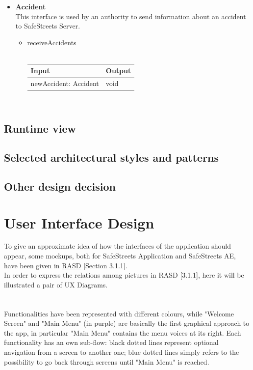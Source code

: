 \documentclass{article}
\begin{document}
\begin{itemize}
			\item \textbf{Accident}\\
				This interface is used by an authority to send information about an accident to SafeStreets Server.
				\begin{itemize}
					\item{receiveAccidents}\\\\
					\begin{tabular}{l | l}
						\textbf{Input} & \textbf{Output}\\
						\hline
						newAccident: Accident & void\\
					\end{tabular}\\
				\end{itemize}
		\end{itemize}
		\subsection{Runtime	view}
		\subsection{Selected architectural styles and patterns}
		\subsection{Other design decision}
	\clearpage	
	\section{User Interface Design}
		To give an approximate idea of how the interfaces of the application should appear, some mockups, both for SafeStreets Application and SafeStreets AE, have been given in \href{run:d:../DeliveryFolder/RASD1.pdf}{RASD} [Section 3.1.1].\\ 
		In order to express the relations among pictures in RASD [3.1.1], here it will be illustrated a pair of UX Diagrams.
		\\\\\\
		Functionalities have been represented with different colours, while "Welcome Screen" and "Main Menu" (in purple) are basically the first graphical approach to the app, in particular "Main Menu" contains the menu voices at its right.
		Each functionality has an own sub-flow: black dotted lines represent optional navigation from a screen to another one; blue dotted lines simply refers to the possibility to go back through screens until "Main Menu" is reached.
		
\end{document}
